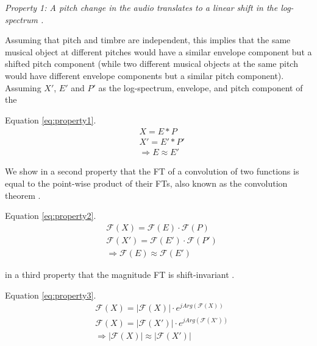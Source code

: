 \documentclass[journal]{IEEEtran}
\begin{document}
\emph{Property 1: A pitch change in the audio translates to a linear shift in the log-spectrum \cite{brown1991, brown1992}.}

Assuming that pitch and timbre are independent, this implies that the same musical object at different pitches would have a similar envelope component but a shifted pitch component (while two different musical objects at the same pitch would have different envelope components but a similar pitch component). Assuming $X'$, $E'$ and $P'$ as the log-spectrum, envelope, and pitch component of the 



Equation \ref{eq:property1}.
\begin{equation}
\label{eq:property1}
\begin{split}
&X = E * P \\
&X' = E' * P' \\
&\Rightarrow E \approx E'
\end{split}
\end{equation}


We show in a second property that the FT of a convolution of two functions is equal to the point-wise product of their FTs, also known as the convolution theorem \cite{proakis1995}.

Equation \ref{eq:property2}.
\begin{equation}
\label{eq:property2}
\begin{split}
&\mathcal{F}(X) = \mathcal{F}(E) \cdot \mathcal{F}(P) \\
&\mathcal{F}(X') = \mathcal{F}(E') \cdot \mathcal{F}(P') \\
&\Rightarrow \mathcal{F}(E) \approx \mathcal{F}(E')
\end{split}
\end{equation}

in a third property that the magnitude FT is shift-invariant \cite{proakis1995}.

Equation \ref{eq:property3}.
\begin{equation}
\label{eq:property3}
\begin{split}
&\mathcal{F}(X) = |\mathcal{F}(X)| \cdot e^{j Arg(\mathcal{F}(X))} \\
&\mathcal{F}(X) = |\mathcal{F}(X')| \cdot e^{j Arg(\mathcal{F}(X'))} \\
&\Rightarrow |\mathcal{F}(X)| \approx |\mathcal{F}(X')|
\end{split}
\end{equation}
\end{document}
